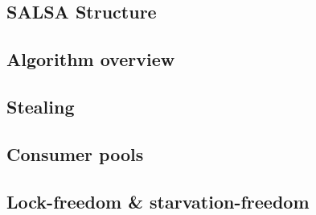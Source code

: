 \subsection{SALSA Structure\label{alg-structure}}

\subsection{Algorithm overview\label{alg-overview}}

\subsection{Stealing\label{alg-stealing}}
\subsection{Consumer pools\label{alg-pools}}
\subsection{Lock-freedom \& starvation-freedom\label{alg-properties}}